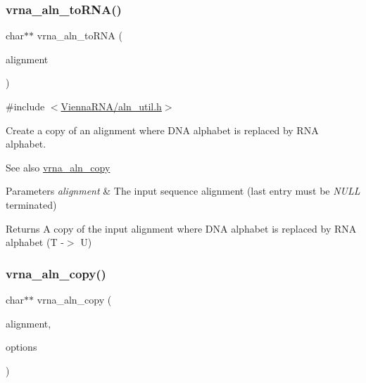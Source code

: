 \subsubsection{\texorpdfstring{vrna\+\_\+aln\+\_\+to\+R\+N\+A()}{vrna\_aln\_toRNA()}}
{\footnotesize\ttfamily char$\ast$$\ast$ vrna\+\_\+aln\+\_\+to\+R\+NA (\begin{DoxyParamCaption}\item[{const char $\ast$$\ast$}]{alignment }\end{DoxyParamCaption})}



{\ttfamily \#include $<$\mbox{\hyperlink{aln__util_8h}{Vienna\+R\+N\+A/aln\+\_\+util.\+h}}$>$}



Create a copy of an alignment where D\+NA alphabet is replaced by R\+NA alphabet. 

\begin{DoxySeeAlso}{See also}
\mbox{\hyperlink{group__aln__utils_ga08cdca592461436860daf9738279ce17}{vrna\+\_\+aln\+\_\+copy}}
\end{DoxySeeAlso}

\begin{DoxyParams}{Parameters}
{\em alignment} & The input sequence alignment (last entry must be {\itshape N\+U\+LL} terminated) \\
\hline
\end{DoxyParams}
\begin{DoxyReturn}{Returns}
A copy of the input alignment where D\+NA alphabet is replaced by R\+NA alphabet (T -\/$>$ U) 
\end{DoxyReturn}
\mbox{\label{group__aln__utils_ga08cdca592461436860daf9738279ce17}} 
\subsubsection{\texorpdfstring{vrna\+\_\+aln\+\_\+copy()}{vrna\_aln\_copy()}}
{\footnotesize\ttfamily char$\ast$$\ast$ vrna\+\_\+aln\+\_\+copy (\begin{DoxyParamCaption}\item[{const char $\ast$$\ast$}]{alignment,  }\item[{unsigned int}]{options }\end{DoxyParamCaption})}



